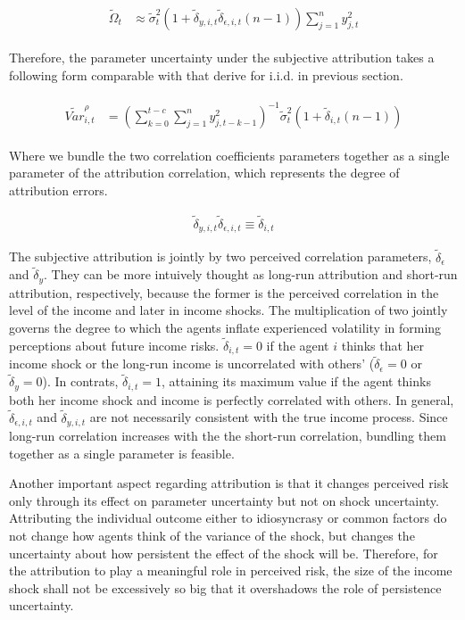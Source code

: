 \documentclass[12pt,notitlepage,onecolumn,aps,pra]{article}
\begin{document}
\begin{eqnarray}
\begin{split}
\tilde \Omega_{t} & \approx \tilde \sigma^2_{t} (1+\tilde \delta_{y,i,t}\tilde \delta_{\epsilon,i,t}(n-1)) \sum^{n}_{j=1}y^2_{j,t}
\end{split}
\end{eqnarray}

Therefore, the parameter uncertainty under the subjective attribution
takes a following form comparable with that derive for i.i.d. in
previous section.

\begin{eqnarray}
\begin{split}
\tilde {Var}^{\rho}_{i,t} & = (\sum^{t-c}_{k=0}\sum^{n}_{j=1}y^2_{j,t-k-1})^{-1}\tilde{\sigma}^2_{t}(1+ \tilde\delta_{i,t}(n-1))
\end{split}
\end{eqnarray}

Where we bundle the two correlation coefficients parameters together as
a single parameter of the attribution correlation, which represents the
degree of attribution errors.

\begin{eqnarray}
\tilde \delta_{y,i,t}\tilde \delta_{\epsilon,i,t}\equiv \tilde \delta_{i,t}  
\end{eqnarray}

The subjective attribution is jointly by two perceived correlation
parameters, \(\tilde \delta_{\epsilon}\) and \(\tilde \delta_y\). They
can be more intuively thought as long-run attribution and short-run
attribution, respectively, because the former is the perceived
correlation in the level of the income and later in income shocks. The
multiplication of two jointly governs the degree to which the agents
inflate experienced volatility in forming perceptions about future
income risks. \(\tilde \delta_{i,t} = 0\) if the agent \(i\) thinks that
her income shock or the long-run income is uncorrelated with others'
(\(\tilde \delta_{\epsilon} = 0\) or \(\tilde \delta_y = 0\)). In
contrats, \(\tilde \delta_{i,t} = 1\), attaining its maximum value if
the agent thinks both her income shock and income is perfectly
correlated with others. In general, \(\tilde \delta_{\epsilon,i,t}\) and
\(\tilde \delta_{y,i,t}\) are not necessarily consistent with the true
income process. Since long-run correlation increases with the the
short-run correlation, bundling them together as a single parameter is
feasible.

Another important aspect regarding attribution is that it changes
perceived risk only through its effect on parameter uncertainty but not
on shock uncertainty. Attributing the individual outcome either to
idiosyncrasy or common factors do not change how agents think of the
variance of the shock, but changes the uncertainty about how persistent
the effect of the shock will be. Therefore, for the attribution to play
a meaningful role in perceived risk, the size of the income shock shall
not be excessively so big that it overshadows the role of persistence
uncertainty.
\end{document}
